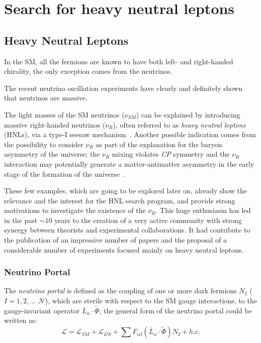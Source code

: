 
\part {Search for heavy neutral leptons}


\chapter{Heavy Neutral Leptons} 
\label{Chapter3} 


In the SM, all the fermions are known to have both left- and right-handed chirality, the only exception comes from the neutrinos.

The recent neutrino oscillation experiments have clearly and
definitely shown that neutrinos are massive.

The light masses of the SM neutrinos ($\nu_{SM}$) can be explained by introducing massive right-handed neutrinos ($\nu_{R}$), often referred to as \emph{heavy neutral leptons} (HNLs), via a type-I seesaw mechanism~\cite{MINKOWSKI1977421,gellmann2013complex,PhysRevLett.44.912,PhysRevD.22.2227}.
Another possible indication comes from the possibility to consider
$\nu_{R}$ as part of the explanation for the baryon asymmetry of the
universe; the $\nu_{R}$ mixing violates \emph{CP} symmetry and the $\nu_{R}$ interaction may potentially generate a matter-antimatter asymmetry in the early stage of the formation of the universe~\cite{Canetti_2012,KUZMIN198536}.

These few examples, which are going to be explored later on, already
show the relevance and the interest for the HNL search program, and
provide strong motivations to investigate the existence of the
$\nu_{R}$. This huge enthusiasm has led in the past $\sim10$ years to
the creation of a very active community with strong synergy between
theorists and experimental collaborations. It had contribute to the publication of an impressive number of papers and the proposal of a considerable number of experiments focused mainly on heavy neutral leptons. 

\section{Neutrino Portal} \label{sec:neutrinoPortal}
The \emph{neutrino portal} is defined as the coupling of one or more dark fermions $N_{I}$  ($I = 1,2,...$ $\mathcal{N}$), which are sterile with respect to the SM gauge interactions, to the gauge-invariant operator $\bar{L}_{\alpha}  \cdot \widetilde \Phi$; the general form of the neutrino portal could be written as: 
\begin{equation}
\label{eq:neutrinoportal}
\mathcal{L} = \mathcal{L}_{SM} + \mathcal{L}_{DS} + \sum F_{\alpha I} (\bar{L}_{\alpha}  \cdot \widetilde \Phi)N_{I} + h.c.
\end{equation}

